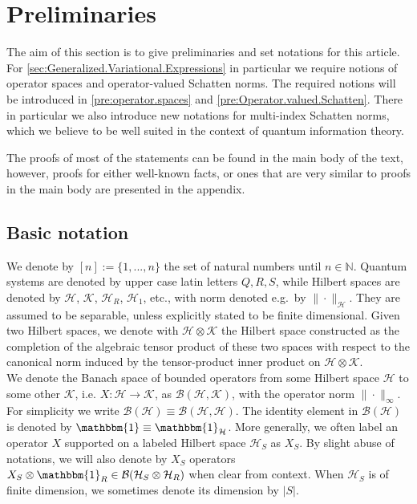 \documentclass[11pt]{article}
\newcommand{\jk}[1]{\textcolor{cyan}{JK:~#1}}
\newcommand{\1}{\ensuremath{\mathbbm{1}}}
\theoremstyle{newdefinition}
\theoremstyle{newplain}
\theoremstyle{myplain}
\begin{document}
\section{Preliminaries}\label{sec:preliminaries}

The aim of this section is to give preliminaries and set notations for this article. For \cref{sec:Generalized.Variational.Expressions} in particular we require notions of operator spaces and operator-valued Schatten norms. The required notions will be introduced in \cref{pre:operator.spaces} and \cref{pre:Operator.valued.Schatten}. There in particular we also introduce new notations for multi-index Schatten norms, which we believe to be well suited in the context of quantum information theory.


The proofs of most of the statements can be found in the main body of the text, however, proofs for either  well-known facts, or ones that are very similar to proofs in the main body are presented in the appendix.

\subsection{Basic notation}
We denote by $[n]:=\{1,...,n\}$ the set of natural numbers until $n\in\mathbb{N}$. Quantum systems are denoted by upper case latin letters $Q,R,S$, while Hilbert spaces are denoted by $\mathcal{H}$, $\mathcal{K}$, $\mathcal{H}_R$, $\mathcal{H}_1$, etc., with norm denoted e.g.~by $\|\cdot \|_{\mathcal{H}}$. They are assumed to be separable, unless explicitly stated to be finite dimensional.
Given two Hilbert spaces, we denote with $\mathcal{H}\otimes\mathcal{K}$ the Hilbert space constructed as the completion of the algebraic tensor product of these two spaces with respect to the canonical norm induced by the tensor-product inner product on $\mathcal{H}\otimes\mathcal{K}$. \\
We denote the Banach space of bounded operators from some Hilbert space $\mathcal{H}$ to some other $\mathcal{K}$, i.e. $X:\mathcal{H}\to \mathcal{K}$, as $\mathcal{B}(\mathcal{H},\mathcal{K})$, with the operator norm $\|\cdot\|_\infty$. For simplicity we write $\mathcal{B}(\mathcal{H})\equiv \mathcal{B}(\mathcal{H},\mathcal{H})$. The identity element in $\mathcal{B}(\mathcal{H})$ is denoted by $\1\equiv\1_\mathcal{H}$. More generally, we often label an operator $X$ supported on a labeled Hilbert space $\mathcal{H}_S$ as $X_S$. By slight abuse of notations, we will also denote by $X_S$ operators $X_S\otimes \1_R\in \mathcal{B}(\mathcal{H}_S\otimes\mathcal{H}_R)$ when clear from context. When $\mathcal{H}_S$ is of finite dimension, we sometimes denote its dimension by $|S|$.
\end{document}
